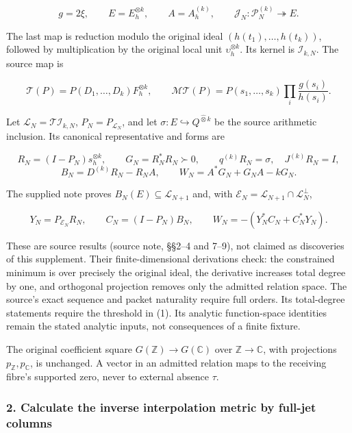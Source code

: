 \[
g=2\xi,\qquad E=E_h^{\otimes k},\qquad A=A_h^{(k)},\qquad
\mathcal J_N:\mathcal P_N^{(k)}\twoheadrightarrow E.
\tag{1}
\]

The last map is reduction modulo the original ideal
\((h(t_1),\ldots,h(t_k))\), followed by multiplication by the original
local unit \(\upsilon_h^{\otimes k}\). Its kernel is
\(\mathcal I_{k,N}\). The source map is

\[
\mathcal T(P)=P(D_1,\ldots,D_k)F_h^{\otimes k},\qquad
\mathcal M\mathcal T(P)=P(s_1,\ldots,s_k)\prod_i\frac{g(s_i)}{h(s_i)}.
\tag{2}
\]

Let \(\mathcal L_N=\mathcal T\mathcal I_{k,N}\),
\(P_N=P_{\mathcal L_N}\), and let
\(\sigma:E\hookrightarrow Q^{\widehat\otimes k}\) be the source
arithmetic inclusion. Its canonical representative and forms are

\[
R_N=(I-P_N)s_h^{\otimes k},\qquad G_N=R_N^*R_N\succ0,
\qquad q^{(k)}R_N=\sigma,\quad J^{(k)}R_N=I,
\tag{3}
\] \[
B_N=D^{(k)}R_N-R_NA,\qquad
W_N=A^*G_N+G_NA-kG_N.
\tag{4}
\]

The supplied note proves \(B_N(E)\subseteq\mathcal L_{N+1}\) and, with
\(\mathcal E_N=\mathcal L_{N+1}\cap\mathcal L_N^\perp\),

\[
Y_N=P_{\mathcal E_N}R_N,
\qquad C_N=(I-P_N)B_N,
\qquad W_N=-(Y_N^*C_N+C_N^*Y_N).
\tag{5}
\]

These are source results (source note, §§2--4 and 7--9), not claimed as
discoveries of this supplement. Their finite-dimensional derivations
check: the constrained minimum is over precisely the original ideal, the
derivative increases total degree by one, and orthogonal projection
removes only the admitted relation space. The source's exact sequence
and packet naturality require full orders. Its total-degree statements
require the threshold in (1). Its analytic function-space identities
remain the stated analytic inputs, not consequences of a finite fixture.

The original coefficient square \(G(\mathbb Z)\to G(\mathbb C)\) over
\(\mathbb Z\to\mathbb C\), with projections \(p_\mathbb Z,p_\mathbb C\),
is unchanged. A vector in an admitted relation maps to the receiving
fibre's supported zero, never to external absence \(\tau\).

\subsubsection{2. Calculate the inverse interpolation metric by full-jet
columns}\label{kernel_layer:calculate-the-inverse-interpolation-metric-by-full-jet-columns}

